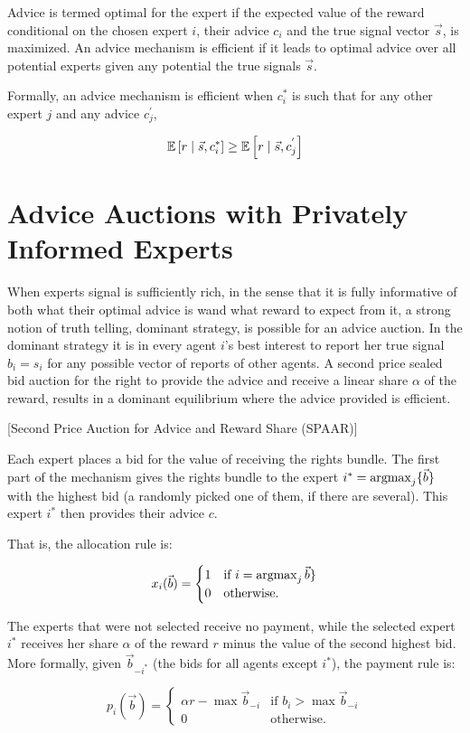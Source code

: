 Advice is termed optimal for the expert if the expected value of the reward conditional on the chosen expert $i$, their advice  $c_i$  and the true signal vector $\vec{s}$, is maximized. An advice mechanism is efficient if it leads to optimal advice over all potential experts given any potential the true signals $\vec{s}$.

Formally, an advice mechanism is efficient when $c^*_i$ is such that for any other expert $j$ and any advice $c^{'}_j$,

$$
\operatorname*{\mathbb E} \left[r \mid \vec{s}, c^*_i \right]
\geq
\operatorname*{\mathbb E} \left[r \mid \vec{s}, c^{'}_j \right]
$$


 
\section{Advice Auctions with Privately Informed Experts}

When experts signal is sufficiently rich, in the sense that it is fully informative of both what their optimal advice is wand what reward to expect from it, a  strong notion of truth telling, dominant strategy, is possible for an advice auction. In the dominant strategy it is in every agent $i$'s best interest to report her true signal $b_i = s_i$ for any possible vector of reports of other agents. 
A second price sealed bid auction for the right to provide the advice and receive a linear share $\alpha$ of the reward, results in a dominant equilibrium where the advice provided is efficient. 

\begin{mech}\label{mech:share2ndprice}[Second Price Auction for Advice and Reward Share (SPAAR)]

   Each expert places a bid for the value of receiving the rights bundle.
   The first part of the mechanism gives the rights bundle to the expert $i^*=\operatorname*{argmax}_j \{\vec b\} $ with the highest  bid (a randomly picked one of them, if there are several).
   This expert $i^*$ then provides their advice $c$. 

   That is, the allocation rule is:

   $$x_i(\vec{b}) = \begin{cases} 1 & \text{if } i = \operatorname*{argmax}_j \vec{b}\}  \\ 0 & \text{otherwise.} \end{cases}$$

The experts that were not selected receive no payment, while the selected expert $i^*$ receives her share $\alpha$ of the reward $r$ minus the value of the second highest bid.
More formally, given $\vec{b}_{-i^*}$ (the bids for all agents except $i^*$), the payment rule is:

   $$p_i(\vec b)= \begin{cases}  \alpha r - \max \vec{b}_{-i}  & \text{if }b_i > \max \vec{b}_{-i} \\ 0 & \text{otherwise.} \end{cases}$$

\end{mech}

